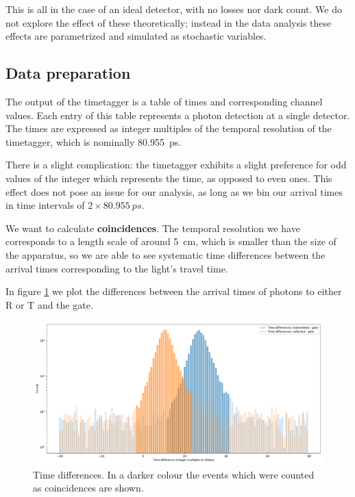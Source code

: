 \documentclass[main.tex]{subfiles}
\begin{document}
This is all in the case of an ideal detector, with no losses nor dark count. We do not explore the effect of these theoretically; instead in the data analysis these effects are parametrized and simulated as stochastic variables. 

\subsection{Data preparation}

The output of the timetagger is a table of times and corresponding channel values.
Each entry of this table represents a photon detection at a single detector.
The times are expressed as integer multiples of the temporal resolution of the timetagger, which is nominally \SI{80.955}{ps}.

There is a slight complication: the timetagger exhibits a slight preference for odd values of the integer which represents the time, as opposed to even ones. This effect does not pose an issue for our analysis, as long as we bin our arrival times in time intervals of \(2 \times \SI{80.955}{ps}\). 

We want to calculate \textbf{coincidences}. The temporal resolution we have corresponds to a length scale of around \SI{5}{cm}, which is smaller than the size of the apparatus, so we are able to see systematic time differences between the arrival times corresponding to the light's travel time. 

In figure \ref{fig:single_photon_timedifferences} we plot the differences between the arrival times of photons to either R or T and the gate. 

\begin{figure}[ht]
\centering
\includegraphics[width=\textwidth]{figures/single_photon_timedifferences}
\caption{Time differences. In a darker colour the events which were counted as coincidences are shown.}
\label{fig:single_photon_timedifferences}
\end{figure}
\end{document}
